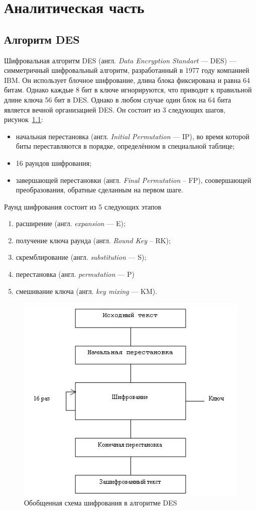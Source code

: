 \chapter{Аналитическая часть}

\section{Алгоритм DES}

Шифровальная алгоритм DES (англ. \textit{Data Encryption Standart} --- DES) --- симметричный шифровальный алгоритм, разработанный в 1977 году компанией IBM. Он использует блочное шифрование, длина блока фиксирована и равна 64 битам. 
Однако каждые 8 бит в ключе игнорируются, что приводит к правильной длине ключа 56 бит в DES. 
Однако в любом случае один блок на 64 бита является вечной организацией DES.
Он состоит из 3 следующих шагов, рисунок~\ref{fig:des}: 
\begin{itemize}
	\item начальная перестановка (англ. \textit{Initial Permutation} --- IP), во время которой биты переставляются в порядке, определённом в специальной таблице;
	\item 16 раундов шифрования;
	\item завершающей перестановки (англ. \textit{Final Permutation} -- FP), соовершающей преобразования, обратные сделанным на первом шаге.
\end{itemize}

Раунд шифрования состоит из 5 следующих этапов
\begin{enumerate}[label=\arabic*)]
	\item расширение (англ. \textit{expansion} --- E);
	\item получение ключа раунда (англ. \textit{Round Key} -- RK);
	\item скремблирование (англ. \textit{substitution} --- S);
	\item перестановка (англ. \textit{permutation} --- P)
	\item смешивание ключа (англ. \textit{key mixing} --- KM).
\end{enumerate}

\clearpage

\begin{figure}[ht!]
	\centering
	\includegraphics[width=0.7\linewidth]{img/des.png}
	\caption{Обобщенная схема шифрования в алгоритме DES}
	\label{fig:des}
\end{figure}


